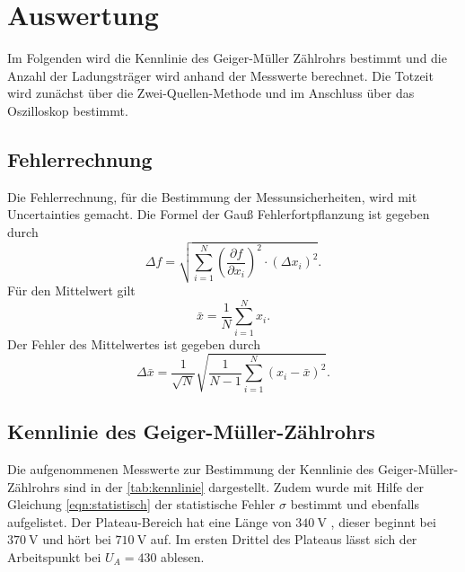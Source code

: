 \section{Auswertung}
\label{sec:auswertung}
Im Folgenden wird die Kennlinie des Geiger-Müller Zählrohrs bestimmt und 
die Anzahl der Ladungsträger wird anhand der Messwerte berechnet. Die Totzeit wird zunächst über die Zwei-Quellen-Methode
und im Anschluss über das Oszilloskop bestimmt.

\subsection{Fehlerrechnung}
\label{sec:Fehlerrechnung}
Die Fehlerrechnung, für die Bestimmung der Messunsicherheiten, wird mit Uncertainties \cite{uncertainties} gemacht.
Die Formel der Gauß Fehlerfortpflanzung ist gegeben durch
\begin{equation}
    \Delta f=\sqrt{\sum_{i=1}^N\left(\frac{\partial f}{\partial x_i}\right)^2 \cdot\left(\Delta x_i\right)^2}.
    \label{eqn:gauss}
\end{equation}
Für den Mittelwert gilt 
\begin{equation}
    \bar{x} = \frac{1}{N}\sum\limits_{i = 1}^N x_i .
    \label{eqn:mittelwert}
\end{equation}
Der Fehler des Mittelwertes ist gegeben durch 
\begin{equation}
    \Delta \bar{x}=\frac{1}{\sqrt{N}} \sqrt{\frac{1}{N-1} \sum_{i=1}^N\left(x_i-\bar{x}\right)^2}.
    \label{eqn:mittelwertfehler}
\end{equation}

\subsection{Kennlinie des Geiger-Müller-Zählrohrs}
\label{sec:Kennlinie des Geiger-Müller-Zählrohrs}

Die aufgenommenen Messwerte zur Bestimmung der Kennlinie des Geiger-Müller-Zählrohrs sind in der \autoref{tab:kennlinie}
dargestellt. Zudem wurde mit Hilfe der Gleichung \eqref{eqn:statistisch} der statistische Fehler $\sigma$ bestimmt und ebenfalls aufgelistet.
Der Plateau-Bereich hat eine Länge von $\SI{340}{\volt}$ , dieser beginnt bei $\SI{370}{\volt}$ und hört bei $\SI{710}{\volt}$ auf.
Im ersten Drittel des Plateaus lässt sich der Arbeitspunkt bei $U_A = 430$ ablesen.

